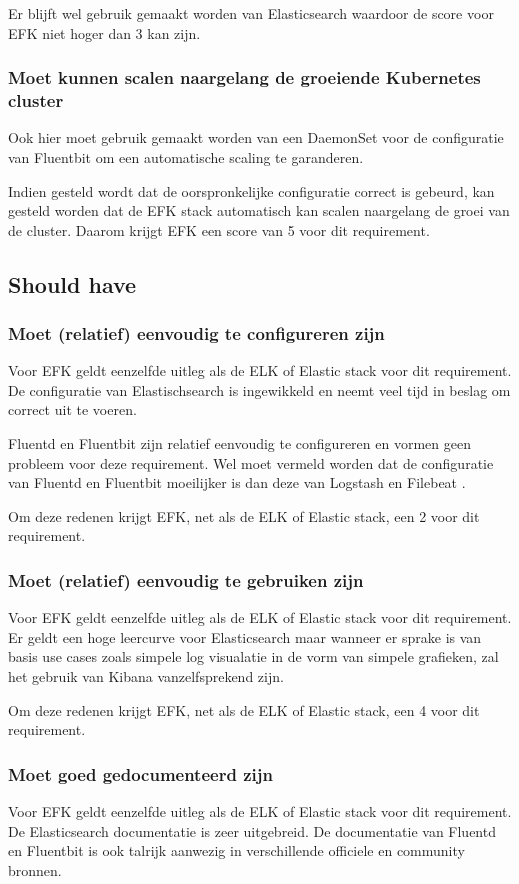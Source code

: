 Er blijft wel gebruik gemaakt worden van Elasticsearch waardoor de score voor EFK niet hoger dan 3 kan zijn.

\subsubsection{Moet kunnen scalen naargelang de groeiende Kubernetes cluster}
Ook hier moet gebruik gemaakt worden van een DaemonSet voor de configuratie van Fluentbit om een automatische scaling te garanderen. 

Indien gesteld wordt dat de oorspronkelijke configuratie correct is gebeurd, kan gesteld worden dat de EFK stack automatisch kan scalen naargelang de groei van de cluster. Daarom krijgt EFK een score van 5 voor dit requirement.

\subsection{Should have}
\subsubsection{Moet (relatief) eenvoudig te configureren zijn}
Voor EFK geldt eenzelfde uitleg als de ELK of Elastic stack voor dit requirement. De configuratie van Elastischsearch is ingewikkeld en neemt veel tijd in beslag om correct uit te voeren. 

Fluentd en Fluentbit zijn relatief eenvoudig te configureren en vormen geen probleem voor deze requirement. Wel moet vermeld worden dat de configuratie van Fluentd en Fluentbit moeilijker is dan deze van Logstash en Filebeat \autocite{harikumar2018}.

Om deze redenen krijgt EFK, net als de ELK of Elastic stack, een 2 voor dit requirement.

\subsubsection{Moet (relatief) eenvoudig te gebruiken zijn}
Voor EFK geldt eenzelfde uitleg als de ELK of Elastic stack voor dit requirement. Er geldt een hoge leercurve voor Elasticsearch maar wanneer er sprake is van basis use cases zoals simpele log visualatie in de vorm van simpele grafieken, zal het gebruik van Kibana vanzelfsprekend zijn.

Om deze redenen krijgt EFK, net als de ELK of Elastic stack, een 4 voor dit requirement.

\subsubsection{Moet goed gedocumenteerd zijn}
Voor EFK geldt eenzelfde uitleg als de ELK of Elastic stack voor dit requirement. De Elasticsearch documentatie is zeer uitgebreid. De documentatie van Fluentd en Fluentbit is ook talrijk aanwezig in verschillende officiele en community bronnen.

